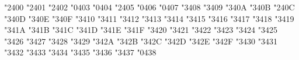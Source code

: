 
\def\amsafam{4} \def\amsbfam{5} \def\txsycfam{6} 
\def\txexafam{7} \def\txmiafam{8}


\mathchardef \boxdot   "2\amsafam 00
\mathchardef \boxplus   "2\amsafam 01
\mathchardef \boxtimes   "2\amsafam 02
\mathchardef \square   "0\amsafam 03
\mathchardef \blacksquare   "0\amsafam 04
\mathchardef \centerdot   "2\amsafam 05
\mathchardef \lozenge   "0\amsafam 06
\mathchardef \blacklozenge   "0\amsafam 07
\mathchardef \circlearrowright   "3\amsafam 08
\mathchardef \circlearrowleft   "3\amsafam 09
\mathchardef \rightleftharpoons   "3\amsafam 0A
\mathchardef \leftrightharpoons   "3\amsafam 0B
\mathchardef \boxminus   "2\amsafam 0C
\mathchardef \Vdash   "3\amsafam 0D
\mathchardef \Vvdash   "3\amsafam 0E
\mathchardef \vDash   "3\amsafam 0F
\mathchardef \twoheadrightarrow   "3\amsafam 10
\mathchardef \twoheadleftarrow   "3\amsafam 11
\mathchardef \leftleftarrows   "3\amsafam 12
\mathchardef \rightrightarrows   "3\amsafam 13
\mathchardef \upuparrows   "3\amsafam 14
\mathchardef \downdownarrows   "3\amsafam 15
\mathchardef \upharpoonright   "3\amsafam 16
\mathchardef \downharpoonright   "3\amsafam 17
\mathchardef \upharpoonleft   "3\amsafam 18
\mathchardef \downharpoonleft   "3\amsafam 19
\mathchardef \rightarrowtail   "3\amsafam 1A
\mathchardef \leftarrowtail   "3\amsafam 1B
\mathchardef \leftrightarrows   "3\amsafam 1C
\mathchardef \rightleftarrows   "3\amsafam 1D
\mathchardef \Lsh   "3\amsafam 1E
\mathchardef \Rsh   "3\amsafam 1F
\mathchardef \rightsquigarrow   "3\amsafam 20
\mathchardef \leftrightsquigarrow   "3\amsafam 21
\mathchardef \looparrowleft   "3\amsafam 22
\mathchardef \looparrowright   "3\amsafam 23
\mathchardef \circeq   "3\amsafam 24
\mathchardef \succsim   "3\amsafam 25
\mathchardef \gtrsim   "3\amsafam 26
\mathchardef \gtrapprox   "3\amsafam 27
\mathchardef \multimap   "3\amsafam 28
\mathchardef \therefore   "3\amsafam 29
\mathchardef \because   "3\amsafam 2A
\mathchardef \doteqdot   "3\amsafam 2B
\mathchardef \triangleq   "3\amsafam 2C
\mathchardef \precsim   "3\amsafam 2D
\mathchardef \lesssim   "3\amsafam 2E
\mathchardef \lessapprox   "3\amsafam 2F
\mathchardef \eqslantless   "3\amsafam 30
\mathchardef \eqslantgtr   "3\amsafam 31
\mathchardef \curlyeqprec   "3\amsafam 32
\mathchardef \curlyeqsucc   "3\amsafam 33
\mathchardef \preccurlyeq   "3\amsafam 34
\mathchardef \leqq   "3\amsafam 35
\mathchardef \leqslant   "3\amsafam 36
\mathchardef \lessgtr   "3\amsafam 37
\mathchardef \backprime   "0\amsafam 38
